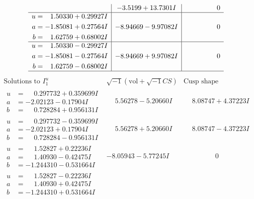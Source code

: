 \documentclass[1p]{elsarticle_modified}
\theoremstyle{definition}
\newcommand{\I}{\sqrt{-1}}
\begin{document}
$$\begin{array}{c|c|c}
 & -3.5199 + 13.7301 I & \phantom{-0.000000 } 0 \\ \hline\begin{aligned}
u &= \phantom{-}1.50330 + 0.29927 I \\
a &= -1.85081 + 0.27564 I \\
b &= \phantom{-}1.62759 + 0.68002 I\end{aligned}
 & -8.94669 - 9.97082 I & \phantom{-0.000000 } 0 \\ \hline\begin{aligned}
u &= \phantom{-}1.50330 - 0.29927 I \\
a &= -1.85081 - 0.27564 I \\
b &= \phantom{-}1.62759 - 0.68002 I\end{aligned}
 & -8.94669 + 9.97082 I & \phantom{-0.000000 } 0\\
 \hline 
 \end{array}$$\newpage$$\begin{array}{c|c|c}  
\text{Solutions to }I^u_{1}& \I (\text{vol} + \sqrt{-1}CS) & \text{Cusp shape}\\
 \hline 
\begin{aligned}
u &= \phantom{-}0.297732 + 0.359699 I \\
a &= -2.02123 - 0.17904 I \\
b &= \phantom{-}0.728284 + 0.956131 I\end{aligned}
 & \phantom{-}5.56278 - 5.20660 I & \phantom{-}8.08747 + 4.37223 I \\ \hline\begin{aligned}
u &= \phantom{-}0.297732 - 0.359699 I \\
a &= -2.02123 + 0.17904 I \\
b &= \phantom{-}0.728284 - 0.956131 I\end{aligned}
 & \phantom{-}5.56278 + 5.20660 I & \phantom{-}8.08747 - 4.37223 I \\ \hline\begin{aligned}
u &= \phantom{-}1.52827 + 0.22236 I \\
a &= \phantom{-}1.40930 - 0.42475 I \\
b &= -1.244310 - 0.531664 I\end{aligned}
 & -8.05943 - 5.77245 I & \phantom{-0.000000 } 0 \\ \hline\begin{aligned}
u &= \phantom{-}1.52827 - 0.22236 I \\
a &= \phantom{-}1.40930 + 0.42475 I \\
b &= -1.244310 + 0.531664 I\end{aligned}

\end{array}$$
\end{document}
